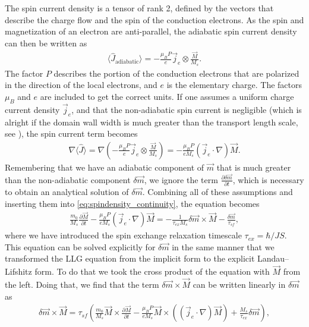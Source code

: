 \documentclass[12pt, a4paper, twoside, openright]{article}		%
\numberwithin{equation}{section}
\begin{document}
The spin current density is a tensor of rank 2, defined by the vectors that describe the charge flow and the spin of the conduction electrons. As the spin and magnetization of an electron are anti-parallel, the adiabatic spin current density can then be written as
\begin{align}
\langle \hat{J}_{\textrm{adiabatic}} \rangle = -\frac{\mu_B P}{e} \vec{j}_e \otimes \frac{\vec{M}}{M_s}.
\end{align}
The factor $P$ describes the portion of the conduction electrons that are polarized in the direction of the local electrons, and $e$ is the elementary charge. The factors $\mu_B$ and $e$ are included to get the correct units. If one assumes a uniform charge current density $\vec{j}_e$, and that the non-adiabatic spin current is negligible (which is alright if the domain wall width is much greater than the transport length scale, see \cite{ZhangLi-04}), the spin current term becomes
\begin{align}
\nabla \langle \hat{J} \rangle = \nabla \left(-\frac{\mu_B P}{e} \vec{j}_e \otimes \frac{\vec{M}}{M_s}\right) = -\frac{\mu_B P}{e M_s} (\vec{j}_e \cdot \nabla) \vec{M}.
\end{align}
Remembering that we have an adiabatic component of $\vec{m}$ that is much greater than the non-adiabatic component $\delta\vec{m}$, we ignore the term $\frac{\partial \delta\vec{m}}{\partial t}$, which is necessary to obtain an analytical solution of $\delta \vec{m}$. Combining all of these assumptions and inserting them into \eqref{eq:spindensity_continuity}, the equation becomes 
\begin{align}
\label{eq:dm_implicit}
\frac{m_0}{M_s}\frac{\partial \vec{M}}{\partial t} - \frac{\mu_B P}{e M_s} (\vec{j}_e \cdot \nabla) \vec{M} = -\frac{1}{\tau_{ex} M_s} \delta\vec{m} \times \vec{M} - \frac{\delta\vec{m}}{\tau_{sf}},
\end{align}
where we have introduced the spin exchange relaxation timescale $\tau_{ex} = \hbar/JS$. This equation can be solved explicitly for $\delta\vec{m}$ in the same manner that we transformed the LLG equation from the implicit form to the explicit Landau--Lifshitz form. To do that we took the cross product of the equation with $\vec{M}$ from the left. Doing that, we find that the term $\delta\vec{m}\times\vec{M}$ can be written linearly in $\delta\vec{m}$ as
\begin{align}
\delta\vec{m} \times \vec{M} = \tau_{sf} \left(\frac{m_0}{M_s} \vec{M} \times \frac{\partial \vec{M}}{\partial t} - \frac{\mu_B P}{e M_s} \vec{M}\times((\vec{j}_e\cdot\nabla)\vec{M}) + \frac{M_s}{\tau_{ex}} \delta\vec{m}\right),
\end{align}
\end{document}
